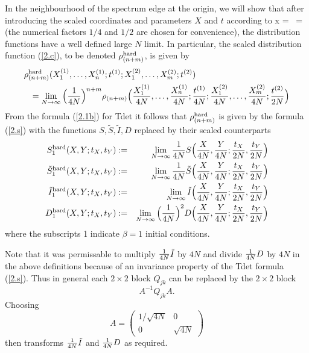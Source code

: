 In the neighbourhood 
of the spectrum edge at the origin, we will show that after 
introducing the scaled coordinates and parameters $X$ and $t$ according to 
\beqa 
x  =  \, \quad \quad \tau =  
\label{3.9}
\eeqa 
(the numerical factors $1/4$
and $1/2$ are chosen for convenience), the distribution 
functions have a well defined large $N$ limit. In particular, the scaled
distribution function (\ref{2.c}), to be denoted $\rho_{(n+m)}^{\rm hard}$,
is given by
\begin{eqnarray}\label{n.1}
\lefteqn{\rho_{(n+m)}^{\rm hard}(X_1^{(1)},\dots,X_n^{(1)};t^{(1)};
X_1^{(2)},\dots,X_m^{(2)};t^{(2)})} \nonumber \\ &&
= \lim_{N \to \infty} \Big ( {1 \over 4N} \Big )^{n+m}
\rho_{(n+m)}\Big ( {X_1^{(1)}\over 4N},\dots,{X_n^{(1)}\over 4N};
{t^{(1)} \over 4N};
{X_1^{(2)} \over 4N},\dots,{X_m^{(2)}\over 4N};{t^{(2)}\over 2N}\Big )
\end{eqnarray}
{}From the formula (\ref{2.1b}) for Tdet it follows that 
$\rho_{(n+m)}^{\rm hard}$ is given by the formula (\ref{2.s}) with 
the functions $S, \tilde{S}, \tilde{I}, D$ replaced by their scaled counterparts
\begin{eqnarray}
S_1^{\rm hard}(X,Y;t_X,t_Y) & := & \lim_{N \to \infty} {1 \over 4N}
S \Big ({X \over 4N}, {Y \over 4N};{t_X \over 2N}, {t_Y \over 2N} \Big )
\label{n.2} \\
\tilde{S}_1^{\rm hard}(X,Y;t_X,t_Y) & := & \lim_{N \to \infty} {1 \over 4N}
\tilde{S} \Big ({X \over 4N}, {Y \over 4N};{t_X \over 2N}, {t_Y \over 2N} \Big )
\label{n.3} \\
\tilde{I}_1^{\rm hard}(X,Y;t_X,t_Y) & := & \lim_{N \to \infty}
\tilde{I} \Big ({X \over 4N}, {Y \over 4N};{t_X \over 2N}, {t_Y \over 2N} \Big )
\label{n.4} \\
D_1^{\rm hard}(X,Y;t_X,t_Y) & := & \lim_{N \to \infty} \Big (
{1 \over 4N} \Big )^2
D \Big ({X \over 4N}, {Y \over 4N};{t_X \over 2N}, {t_Y \over 2N} \Big )
\label{n.5}
\end{eqnarray}
where the subscripts 1 indicate $\beta = 1$ initial conditions.

Note that it was permissable to multiply ${1 \over 4N} \tilde{I}$ by $4N$
and divide ${1 \over 4N} D$ by $4N$ 
in the above definitions
because of an invariance property
of the Tdet formula (\ref{2.s}). Thus in general each $2 \times 2$ block
$Q_{jk}$ can be replaced by the $2 \times 2$ block
\begin{equation}
A^{-1} Q_{jk} A. \label{n.6'}
\end{equation}
Choosing
\begin{equation}
A = \left ( \begin{array}{cc} 1/\sqrt{4N} & 0 \\ 0 & \sqrt{4N} \end{array}
\right )
\end{equation}
then transforms  ${1 \over 4N} \tilde{I}$ and  ${1 \over 4N} D$ as
required.


